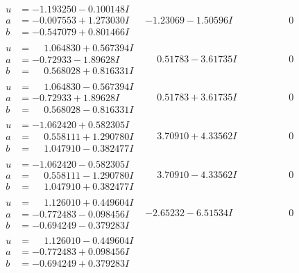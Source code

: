 \documentclass[1p]{elsarticle_modified}
\theoremstyle{definition}
\begin{document}
$$\begin{array}{c|c|c}
\begin{aligned}
u &= -1.193250 - 0.100148 I \\
a &= -0.007553 + 1.273030 I \\
b &= -0.547079 + 0.801466 I\end{aligned}
 & -1.23069 - 1.50596 I & \phantom{-0.000000 } 0 \\ \hline\begin{aligned}
u &= \phantom{-}1.064830 + 0.567394 I \\
a &= -0.72933 - 1.89628 I \\
b &= \phantom{-}0.568028 + 0.816331 I\end{aligned}
 & \phantom{-}0.51783 - 3.61735 I & \phantom{-0.000000 } 0 \\ \hline\begin{aligned}
u &= \phantom{-}1.064830 - 0.567394 I \\
a &= -0.72933 + 1.89628 I \\
b &= \phantom{-}0.568028 - 0.816331 I\end{aligned}
 & \phantom{-}0.51783 + 3.61735 I & \phantom{-0.000000 } 0 \\ \hline\begin{aligned}
u &= -1.062420 + 0.582305 I \\
a &= \phantom{-}0.558111 + 1.290780 I \\
b &= \phantom{-}1.047910 - 0.382477 I\end{aligned}
 & \phantom{-}3.70910 + 4.33562 I & \phantom{-0.000000 } 0 \\ \hline\begin{aligned}
u &= -1.062420 - 0.582305 I \\
a &= \phantom{-}0.558111 - 1.290780 I \\
b &= \phantom{-}1.047910 + 0.382477 I\end{aligned}
 & \phantom{-}3.70910 - 4.33562 I & \phantom{-0.000000 } 0 \\ \hline\begin{aligned}
u &= \phantom{-}1.126010 + 0.449604 I \\
a &= -0.772483 - 0.098456 I \\
b &= -0.694249 - 0.379283 I\end{aligned}
 & -2.65232 - 6.51534 I & \phantom{-0.000000 } 0 \\ \hline\begin{aligned}
u &= \phantom{-}1.126010 - 0.449604 I \\
a &= -0.772483 + 0.098456 I \\
b &= -0.694249 + 0.379283 I\end{aligned}

\end{array}$$
\end{document}
